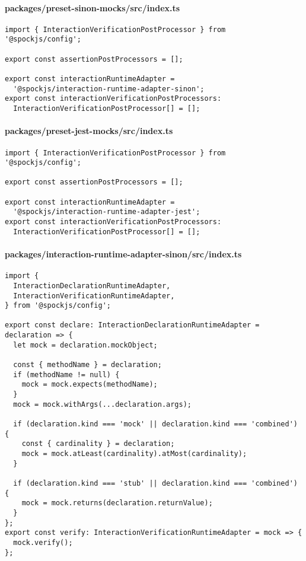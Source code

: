 \paragraph*{packages/preset-sinon-mocks/src/index.ts}
\begin{verbatim}
import { InteractionVerificationPostProcessor } from '@spockjs/config';

export const assertionPostProcessors = [];

export const interactionRuntimeAdapter =
  '@spockjs/interaction-runtime-adapter-sinon';
export const interactionVerificationPostProcessors:
  InteractionVerificationPostProcessor[] = [];
\end{verbatim}

\paragraph*{packages/preset-jest-mocks/src/index.ts}
\begin{verbatim}
import { InteractionVerificationPostProcessor } from '@spockjs/config';

export const assertionPostProcessors = [];

export const interactionRuntimeAdapter =
  '@spockjs/interaction-runtime-adapter-jest';
export const interactionVerificationPostProcessors:
  InteractionVerificationPostProcessor[] = [];
\end{verbatim}

\paragraph*{packages/interaction-runtime-adapter-sinon/src/index.ts}
\begin{verbatim}
import {
  InteractionDeclarationRuntimeAdapter,
  InteractionVerificationRuntimeAdapter,
} from '@spockjs/config';

export const declare: InteractionDeclarationRuntimeAdapter = declaration => {
  let mock = declaration.mockObject;

  const { methodName } = declaration;
  if (methodName != null) {
    mock = mock.expects(methodName);
  }
  mock = mock.withArgs(...declaration.args);

  if (declaration.kind === 'mock' || declaration.kind === 'combined') {
    const { cardinality } = declaration;
    mock = mock.atLeast(cardinality).atMost(cardinality);
  }

  if (declaration.kind === 'stub' || declaration.kind === 'combined') {
    mock = mock.returns(declaration.returnValue);
  }
};
export const verify: InteractionVerificationRuntimeAdapter = mock => {
  mock.verify();
};
\end{verbatim}

